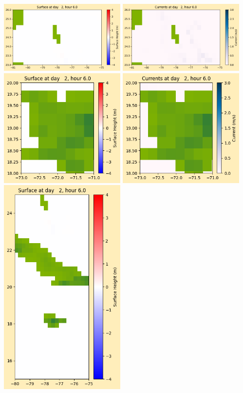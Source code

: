 \documentclass[11pt]{article}
\begin{document}
\vskip 10pt 
\includegraphics[width=0.475\textwidth]{frame0021fig1003.png}
\includegraphics[width=0.475\textwidth]{frame0021fig1004.png}
\vskip 10pt 
\includegraphics[width=0.475\textwidth]{frame0021fig1005.png}
\includegraphics[width=0.475\textwidth]{frame0021fig1006.png}
\vskip 10pt 
\includegraphics[width=0.475\textwidth]{frame0021fig1007.png}
\end{document}
